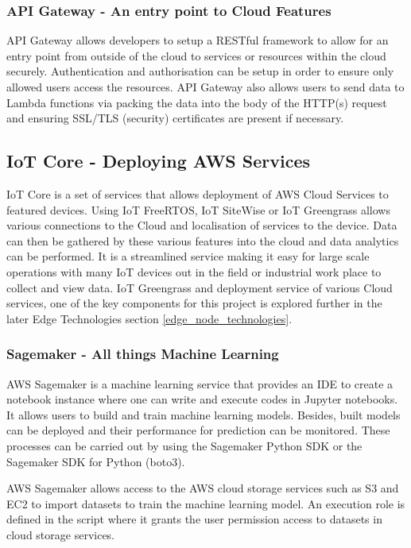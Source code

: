\subsubsection{API Gateway - An entry point to Cloud Features}
API Gateway allows developers to setup a RESTful framework \cite{ch1_2_api_gateway} to allow for an entry point from outside of the cloud to services or resources within the cloud securely. Authentication and authorisation can be setup in order to ensure only allowed users access the resources. API Gateway also allows users to send data to Lambda functions via packing the data into the body of the HTTP(s) request  and ensuring SSL/TLS (security) certificates are present if necessary.

\subsection{IoT Core - Deploying AWS Services}
IoT Core is a set of services that allows deployment of AWS Cloud Services to featured devices. Using IoT FreeRTOS, IoT SiteWise or IoT Greengrass allows various connections to the Cloud and localisation of services to the device. Data can then be gathered by these various features into the cloud and data analytics can be performed. It is a streamlined service making it easy for large scale operations with many IoT devices out in the field or industrial work place to collect and view data. IoT Greengrass and deployment service of various Cloud services, one of the key components for this project is explored further in the later Edge Technologies section \ref{edge_node_technologies}.



\subsubsection{Sagemaker - All things Machine Learning} 
AWS Sagemaker is a machine learning service that provides an IDE to create  a notebook instance where one can write and execute codes in Jupyter notebooks. It allows users to build and train machine learning models. Besides, built models can be deployed and their performance for prediction can be monitored. These processes can be carried out by using the Sagemaker Python SDK or the Sagemaker SDK for Python (boto3).

AWS Sagemaker allows access to the AWS cloud storage services such as S3 and EC2 to import datasets to train the machine learning model. An execution role is defined in the script where it grants the user permission access to datasets in cloud storage services.

